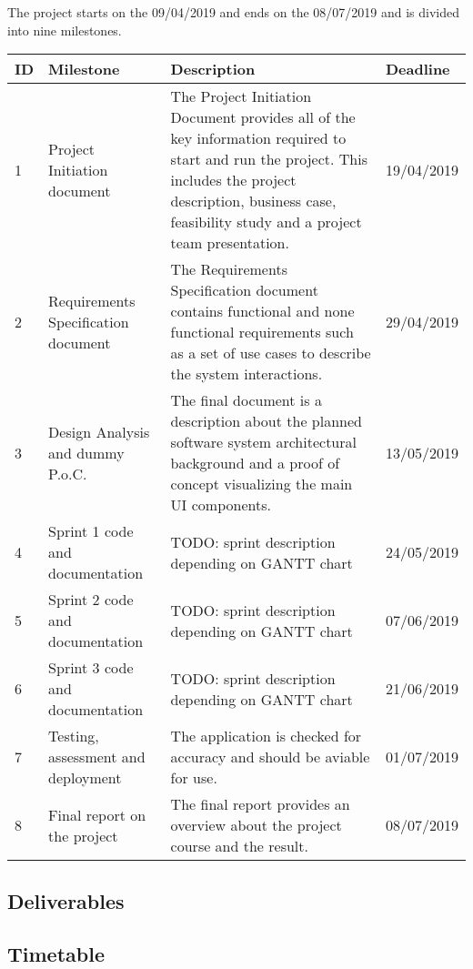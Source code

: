 \documentclass[notitlepage]{article}
\begin{document}
\begin{flushleft}
The project starts on the 09/04/2019 and ends on the 08/07/2019 and is divided into nine milestones.  
\begin{center}
  \begin{tabular}{ m{0.4cm} m{5cm} m{8.5cm} m{2cm} }
  	\hline
		ID & Milestone & Description & Deadline \\ \hline
		1 & Project Initiation document & The Project Initiation Document provides all of the key information required to start and run the project. This includes the project description, business case, feasibility study and a project team presentation.  & 19/04/2019 \\ \hline
		2 & Requirements Specification document & The Requirements Specification document contains functional and none functional requirements such as a set of use cases to describe the system interactions. & 29/04/2019 \\ \hline
		3 & Design Analysis and dummy P.o.C. & The final document is a description about the planned software system architectural background and a proof of concept visualizing the main UI components. & 13/05/2019 \\ \hline
		4 & Sprint 1 code and documentation & {\color{red} TODO: sprint description depending on GANTT chart}  & 24/05/2019 \\ \hline
		5 & Sprint 2 code and documentation & {\color{red} TODO: sprint description depending on GANTT chart} & 07/06/2019 \\ \hline
		6 & Sprint 3 code and documentation & {\color{red} TODO: sprint description depending on GANTT chart} & 21/06/2019 \\ \hline
		7 & Testing, assessment and deployment & The application is checked for accuracy and should be aviable for use. & 01/07/2019 \\ \hline
		8 & Final report on the project & The final report provides an overview about the project course and the result. & 08/07/2019 \\ \hline
	\end{tabular}
\end{center}

\subsection{Deliverables}
    


\subsection{Timetable}


\end{flushleft}
\end{document}
